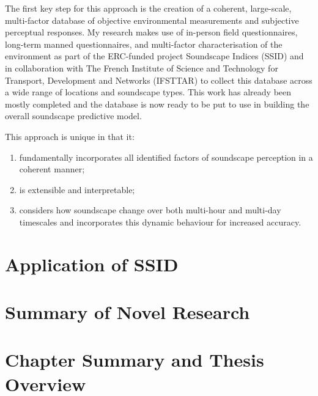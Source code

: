     The first key step for this approach is the creation of a coherent, large-scale, multi-factor database of objective environmental measurements and subjective perceptual responses. My research makes use of in-person field questionnaires, long-term manned questionnaires, and multi-factor characterisation of the environment as part of the ERC-funded project Soundscape Indices (SSID) and in collaboration with The French Institute of Science and Technology for Transport, Development and Networks (IFSTTAR) to collect this database across a wide range of locations and soundscape types. This work has already been mostly completed and the database is now ready to be put to use in building the overall soundscape predictive model.

    This approach is unique in that it:
    \begin{enumerate}
      \item fundamentally incorporates all identified factors of soundscape perception in a coherent manner;
      \item is extensible and interpretable;
      \item considers how soundscape change over both multi-hour and multi-day timescales and incorporates this dynamic behaviour for increased accuracy.
    \end{enumerate}

\section{Application of SSID}

\section{Summary of Novel Research}

\section{Chapter Summary and Thesis Overview}
